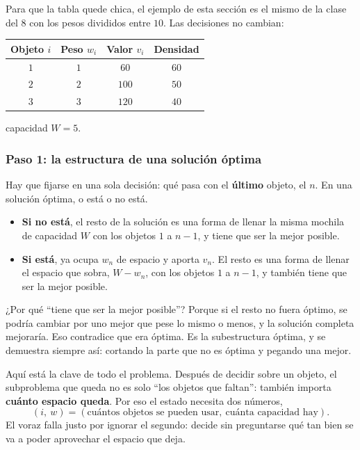 \documentclass[11pt,letterpaper]{article}
\begin{document}
Para que la tabla quede chica, el ejemplo de esta sección es el mismo
de la clase del $8$ con los pesos divididos entre $10$. Las decisiones
no cambian:

\begin{center}
\begin{tabular}{cccc}
  \toprule
  \textbf{Objeto} $i$ & \textbf{Peso} $w_i$ & \textbf{Valor} $v_i$
    & \textbf{Densidad} \\
  \midrule
  $1$ & $1$ & $60$  & $60$ \\
  $2$ & $2$ & $100$ & $50$ \\
  $3$ & $3$ & $120$ & $40$ \\
  \bottomrule
\end{tabular}
\qquad
capacidad $W = 5$.
\end{center}

\subsubsection*{Paso 1: la estructura de una solución óptima}

Hay que fijarse en una sola decisión: qué pasa con el
\textbf{último} objeto, el $n$. En una solución óptima, o está o no
está.

\begin{itemize}[itemsep=0.3em]
  \item \textbf{Si no está}, el resto de la solución es una forma de
        llenar la misma mochila de capacidad $W$ con los objetos $1$ a
        $n - 1$, y tiene que ser la mejor posible.
  \item \textbf{Si está}, ya ocupa $w_n$ de espacio y aporta $v_n$. El
        resto es una forma de llenar el espacio que sobra, $W - w_n$,
        con los objetos $1$ a $n - 1$, y también tiene que ser la
        mejor posible.
\end{itemize}

¿Por qué ``tiene que ser la mejor posible''? Porque si el resto no
fuera óptimo, se podría cambiar por uno mejor que pese lo mismo o
menos, y la solución completa mejoraría. Eso contradice que era óptima.
Es la subestructura óptima, y se demuestra siempre así: cortando la
parte que no es óptima y pegando una mejor.

\begin{idea}
  Aquí está la clave de todo el problema. Después de decidir sobre un
  objeto, el subproblema que queda no es solo ``los objetos que
  faltan'': también importa \textbf{cuánto espacio queda}. Por eso el
  estado necesita dos números,
  \[
    (i,\ w) = (\text{cuántos objetos se pueden usar},\
               \text{cuánta capacidad hay}) .
  \]
  El voraz falla justo por ignorar el segundo: decide sin preguntarse
  qué tan bien se va a poder aprovechar el espacio que deja.
\end{idea}
\end{document}
